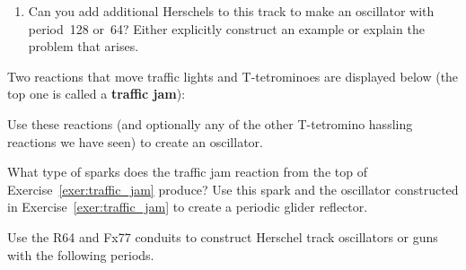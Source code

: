 \begin{multicols}{2}
\begin{problem}
\begin{enumerate}[label=\bf\color{ocre}(\alph*)]
			\item Can you add additional Herschels to this track to make an oscillator with period~128 or~64? Either explicitly construct an example or explain the problem that arises. %
		\end{enumerate}
	\end{problem}
	
	
	\mfilbreak
	
	
	\begin{problemstar}\label{exer:traffic_jam} 
		Two reactions that move traffic lights and T-tetrominoes are displayed below (the top one is called a \textbf{traffic jam}):
		
		\noindent\begin{center}
		\end{center}\vspace*{-0.35cm}
		
		\noindent\begin{center}
		\end{center}
		
		\noindent Use these reactions (and optionally any of the other T-tetromino hassling reactions we have seen) to create an oscillator.
	\end{problemstar}
	
	
	\mfilbreak
	
	
	\begin{problemstar}\label{exer:traffic_jam_reflect} 
		What type of sparks does the traffic jam reaction from the top of Exercise~\ref{exer:traffic_jam} produce? Use this spark and the oscillator constructed in Exercise~\ref{exer:traffic_jam} to create a periodic glider reflector.
	\end{problemstar}
	
	
	\mfilbreak
	
	
	\begin{problem}\label{exer:herschel_track_1} 
		Use the R64 and Fx77 conduits to construct Herschel track oscillators or guns with the following periods.
		

\end{problem}
\end{multicols}
